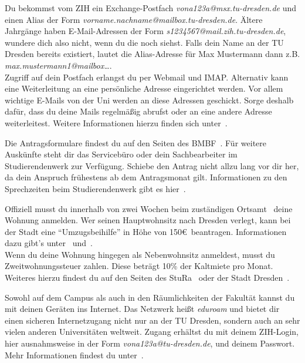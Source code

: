 \begin{itemize}[leftmargin=*]
Du bekommst vom ZIH ein Exchange-Postfach \textit{vona123a@msx.tu-dresden.de}
und einen Alias der Form \textit{vorname.nachname@mailbox.tu-dresden.de}.
Ältere Jahrgänge haben E-Mail-Adressen der Form
\textit{s1234567\allowbreak{}@mail.zih.tu-dresden.de}, wundere dich also nicht,
wenn du die noch siehst. Falls dein Name an der TU Dresden bereits existiert,
lautet die Alias-Adresse für Max Mustermann dann z.B.
\textit{max.mustermann1@mailbox…}. \\
Zugriff auf dein Postfach erlangst du per Webmail und IMAP\@. Alternativ kann eine
Weiterleitung an eine persönliche Adresse eingerichtet werden. Vor allem
wichtige E-Mails von der Uni werden an diese Adressen geschickt. Sorge deshalb
dafür, dass du deine Mails regelmäßig abrufst oder an eine andere Adresse
weiterleitest. Weitere Informationen hierzu finden sich unter~.

Die Antragsformulare findest du auf den Seiten des BMBF~. Für weitere
Auskünfte steht dir das Servicebüro oder dein Sachbearbeiter im
Studierendenwerk zur Verfügung. Schiebe den Antrag nicht allzu lang vor dir
her, da dein Anspruch frühestens ab dem Antragsmonat gilt. Informationen zu den
Sprechzeiten beim Studierendenwerk gibt es hier~.

\pagebreak

Offiziell musst du innerhalb von zwei Wochen beim zuständigen Ortsamt~
deine Wohnung anmelden. Wer seinen Hauptwohnsitz nach Dresden verlegt, kann bei
der Stadt eine \enquote{Umzugsbeihilfe} in Höhe von 150\euro\ beantragen.
Informationen dazu gibt's unter~ und~. \\
Wenn du deine Wohnung hingegen als Nebenwohnsitz anmeldest, musst du
Zweitwohnungssteuer zahlen. Diese beträgt 10\% der Kaltmiete pro Monat.
Weiteres hierzu findest du auf den Seiten des StuRa~ oder der Stadt
Dresden~.

Sowohl auf dem Campus als auch in den Räumlichkeiten der Fakultät kannst du mit
deinen Geräten ins Internet. Das Netzwerk heißt \textit{eduroam} und bietet dir
einen sicheren Internetzugang nicht nur an der TU Dresden, sondern auch an sehr
vielen anderen Universitäten weltweit. Zugang erhältst du mit deinem ZIH-Login,
hier ausnahmsweise in der Form \textit{vona123a@tu-dresden.de}, und deinem
Passwort. Mehr Informationen findest du unter~.


\end{itemize}
